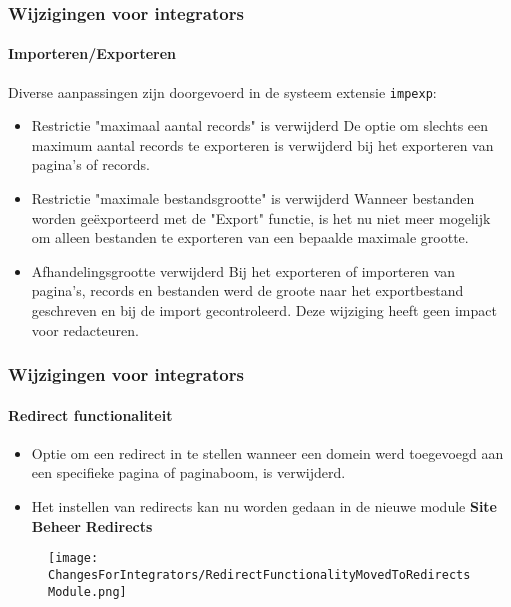 \begin{frame}[fragile]
	\frametitle{Wijzigingen voor  integrators}
	\framesubtitle{Importeren/Exporteren}

	Diverse aanpassingen zijn doorgevoerd in de systeem extensie \texttt{impexp}:

	\begin{itemize}
		\item Restrictie "maximaal aantal records" is verwijderd\newline
			\smaller
				De optie om slechts een maximum aantal records te exporteren is verwijderd
				bij het exporteren van pagina's of records.
			\normalsize

		\item Restrictie "maximale bestandsgrootte" is verwijderd\newline
			\smaller
				Wanneer bestanden worden geëxporteerd met de "Export" functie, is het nu niet meer mogelijk
				om alleen bestanden te exporteren van een bepaalde maximale grootte.
			\normalsize

		\item Afhandelingsgrootte verwijderd\newline
			\smaller
				Bij het exporteren of importeren van pagina's, records en bestanden werd de groote naar het exportbestand
				geschreven en bij de import gecontroleerd.
				Deze wijziging heeft geen impact voor redacteuren.
			\normalsize

	\end{itemize}

\end{frame}


\begin{frame}[fragile]
	\frametitle{Wijzigingen voor  integrators}
	\framesubtitle{Redirect functionaliteit}

	\begin{itemize}
		\item Optie om een redirect in te stellen wanneer een domein werd toegevoegd aan een specifieke pagina of
		    paginaboom, is verwijderd.
		\item Het instellen van redirects kan nu worden gedaan in de nieuwe module\newline
			\textbf{Site Beheer} \textrightarrow \textbf{Redirects}
	\end{itemize}

	\begin{figure}
		\texttt{[image: ChangesForIntegrators/RedirectFunctionalityMovedToRedirectsModule.png]}
	\end{figure}

\end{frame}

